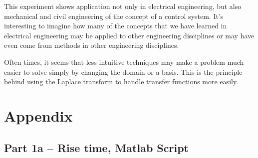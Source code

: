 \documentclass[12pt]{article}
\begin{document}
This experiment shows application not only in electrical engineering, but also mechanical and civil engineering of the concept of a control system.
It's interesting to imagine how many of the concepts that we have learned in electrical engineering may be applied to other engineering disciplines or may have even come from methods in other engineering disciplines.

Often times, it seems that less intuitive techniques may make a problem much easier to solve simply by changing the domain or a basis.
This is the principle behind using the Laplace transform to handle transfer functions more easily.

\newpage
\appendix
\section{Appendix}

\subsection{Part 1a -- Rise time, Matlab Script}\label{sap:solving for .9cf and .1cf}
\inputminted{matlab}{src/part01a_rise_time.m}
\end{document}
